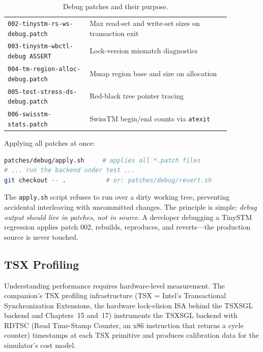 \begin{table}[htbp]
\centering
\caption{Debug patches and their purpose.}
\label{tab:debug-patches}
\begin{tabular}{M{0.32\linewidth}M{0.55\linewidth}}
\hline
{} &  \\
\hline
\texttt{002-tinystm-rs-ws-debug.patch} & Max read-set and write-set sizes on transaction exit \\
\texttt{003-tinystm-wbctl-debug ASSERT} & Lock-version mismatch diagnostics \\
\texttt{004-tm-region-alloc-debug.patch} & Mmap region base and size on allocation \\
\texttt{005-test-stress-ds-debug.patch} & Red-black tree pointer tracing \\
\texttt{006-swisstm-stats.patch} & SwissTM begin/end counts via \texttt{atexit} \\
\hline
\end{tabular}
\end{table}

\noindent
Applying all patches at once:

\begin{lstlisting}[language=bash, caption={Applying debug patches.}]
patches/debug/apply.sh     # applies all *.patch files
# ... run the backend under test ...
git checkout -- .           # or: patches/debug/revert.sh
\end{lstlisting}

\noindent
The \texttt{apply.sh} script refuses to run over a dirty working tree,
preventing accidental interleaving with uncommitted changes.  The
principle is simple: \emph{debug output should live in patches, not in
source}.  A developer debugging a TinySTM regression applies patch
002, rebuilds, reproduces, and reverts---the production source is
never touched.

\subsection{TSX Profiling}
\label{sec:tsx-profiling}

Understanding performance requires hardware-level measurement.  The
companion's TSX profiling infrastructure (TSX = Intel's Transactional
Synchronization Extensions, the hardware lock-elision ISA behind the
TSXSGL backend and Chapters~15 and~17) instruments the TSXSGL
backend with RDTSC (Read Time-Stamp Counter, an x86 instruction that
returns a cycle counter) timestamps at each TSX primitive and produces
calibration data for the simulator's cost model.

